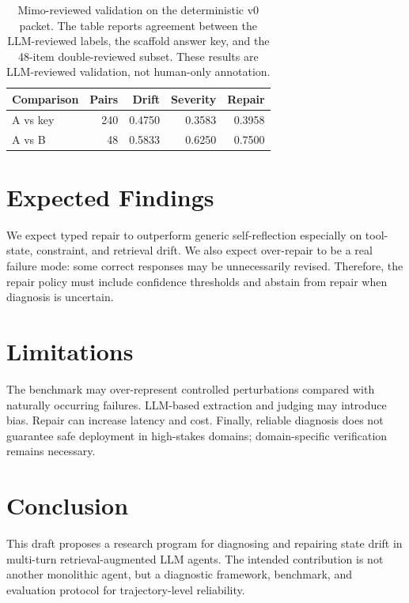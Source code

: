 \documentclass[letterpaper]{article}
\begin{document}
\begin{table}[t]
\centering
\scriptsize
\setlength{\tabcolsep}{3pt}
\begin{tabular}{lrrrr}
\toprule
Comparison & Pairs & Drift & Severity & Repair \\
\midrule
A vs key & 240 & 0.4750 & 0.3583 & 0.3958 \\
A vs B & 48 & 0.5833 & 0.6250 & 0.7500 \\
\bottomrule
\end{tabular}
\caption{Mimo-reviewed validation on the deterministic v0 packet. The table reports agreement between the LLM-reviewed labels, the scaffold answer key, and the 48-item double-reviewed subset. These results are LLM-reviewed validation, not human-only annotation.}
\label{tab:v0-llm-validation}
\end{table}

\section{Expected Findings}

We expect typed repair to outperform generic self-reflection especially on tool-state, constraint, and retrieval drift. We also expect over-repair to be a real failure mode: some correct responses may be unnecessarily revised. Therefore, the repair policy must include confidence thresholds and abstain from repair when diagnosis is uncertain.

\section{Limitations}

The benchmark may over-represent controlled perturbations compared with naturally occurring failures. LLM-based extraction and judging may introduce bias. Repair can increase latency and cost. Finally, reliable diagnosis does not guarantee safe deployment in high-stakes domains; domain-specific verification remains necessary.

\section{Conclusion}

This draft proposes a research program for diagnosing and repairing state drift in multi-turn retrieval-augmented LLM agents. The intended contribution is not another monolithic agent, but a diagnostic framework, benchmark, and evaluation protocol for trajectory-level reliability.
\end{document}
